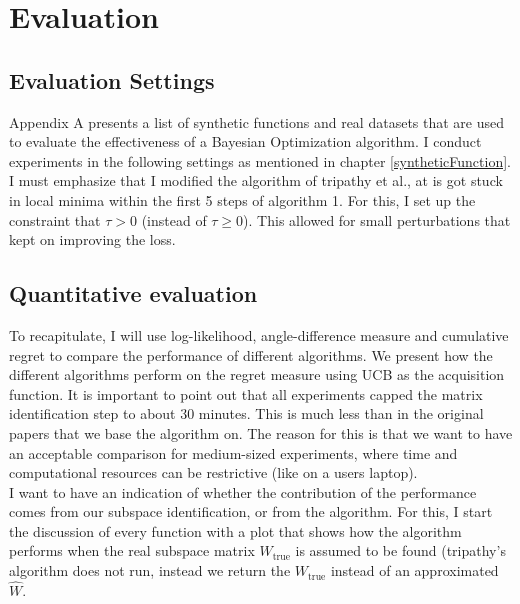 \chapter{Evaluation}

\ifpdf
    \graphicspath{{07_Chapter6/Figs/Raster/}{07_Chapter6/Figs/PDF/}{07_Chapter6/Figs/}}
\else
    \graphicspath{{07_Chapter6/Figs/Vector/}{07_Chapter6/Figs/}}
\fi

\section{Evaluation Settings}

Appendix A presents a list of synthetic functions and real datasets that are used to evaluate the effectiveness of a Bayesian Optimization algorithm. 
I conduct experiments in the following settings as mentioned in chapter \ref{syntheticFunction}.
I must emphasize that I modified the algorithm of tripathy et al., at is got stuck in local minima within the first 5 steps of algorithm 1.
For this, I set up the constraint that $\tau > 0$ (instead of $\tau \geq 0$). 
This allowed for small perturbations that kept on improving the loss.

\section{Quantitative evaluation}
To recapitulate, I will use log-likelihood, angle-difference measure and cumulative regret to compare the performance of different algorithms.
We present how the different algorithms perform on the regret measure using UCB as the acquisition function.
It is important to point out that all experiments capped the matrix identification step to about 30 minutes.
This is much less than in the original papers that we base the algorithm on.
The reason for this is that we want to have an acceptable comparison for medium-sized experiments, where time and computational resources can be restrictive (like on a users laptop). \\

I want to have an indication of whether the contribution of the performance comes from our subspace identification, or from the algorithm. 
For this, I start the discussion of every function with a plot that shows how the algorithm performs when the real subspace matrix $W_{\text{true}}$ is assumed to be found (tripathy's algorithm does not run, instead we return the $W_{\text{true}}$ instead of an approximated $\hat{W}$. \\

